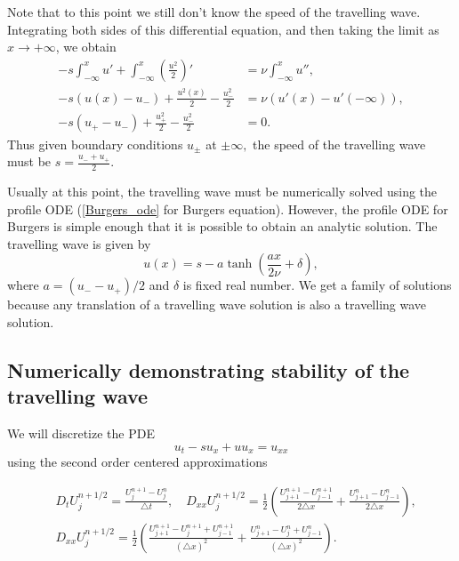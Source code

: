 Note that to this point we still don't know the speed of the travelling wave.  Integrating both sides of this differential equation, and then taking the limit as $x \to +\infty$, we obtain
\begin{align*}
-s\int_{-\infty}^x u' + \int_{-\infty}^x \left(\frac{u^2}{2}\right)' &= \nu \int_{-\infty}^x u'',\\	
-s(u(x) - u_-) + \frac{u^2(x)}{2} - \frac{u_-^2}{2} &= \nu (u'(x) - u'(-\infty)), \\
-s(u_+ - u_-) + \frac{u_+^2}{2} - \frac{u_-^2}{2} &= 0. 
\end{align*}
Thus given boundary conditions $u_{\pm}$ at $\pm \infty,$ the speed of the travelling wave must be $s = \frac{u_- + u_+}{2}.$ 

Usually at this point, the travelling wave must be numerically solved using the profile ODE (\eqref{Burgers_ode} for Burgers equation).  However, the profile ODE for Burgers is simple enough that it is possible to obtain an analytic solution. The travelling wave is  given by 
\[u(x) = s - a \tanh \left(\frac{ax }{2\nu} + \delta\right),\]
where $a = (u_- - u_+)/2$ and $\delta$ is fixed real number. We get a family of solutions because any translation of a travelling wave solution is also a travelling wave solution. 

\subsection*{Numerically demonstrating stability of the travelling wave}
We will discretize the PDE
\[u_t -su_x + uu_x = u_{xx}\]
using the second order centered approximations



\begin{align*}
&{ } D_t U_j^{n+1/2} = \frac{U_j^{n+1}-U_j^n}{\triangle t}, \quad 
D_{xx}U_j^{n+1/2} = \frac{1}{2} \left( \frac{U_{j+1}^{n+1}-U_{j-1}^{n+1}}{2 \triangle x} +  \frac{U_{j+1}^{n}-U_{j-1}^{n}}{2 \triangle x}\right) ,\\
&{ } D_{xx}U_j^{n+1/2} = \frac{1}{2} \left( \frac{U_{j+1}^{n+1}- U_{j}^{n+1}+U_{j-1}^{n+1}}{(\triangle x)^2} + \frac{U_{j+1}^{n}- U_{j}^{n}+U_{j-1}^{n}}{(\triangle x)^2}\right).
\end{align*}

